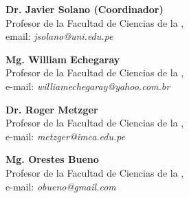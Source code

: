 \begin{center}
\textbf{Dr. Javier Solano (Coordinador)}\\
Profesor de la Facultad de Ciencias de la \institution, \city\\
email: \textit{jsolano@uni.edu.pe}

\textbf{Mg. William Echegaray}\\
Profesor de la Facultad de Ciencias de la \institution, \city\\
e-mail: \textit{williamechegaray@yahoo.com.br}

\textbf{Dr. Roger Metzger}\\
Profesor de la Facultad de Ciencias de la \institution, \city\\
e-mail: \textit{metzger@imca.edu.pe}

\textbf{Mg. Orestes Bueno}\\
Profesor de la Facultad de Ciencias de la \institution, \city\\
e-mail: \textit{obueno@gmail.com}
\end{center}